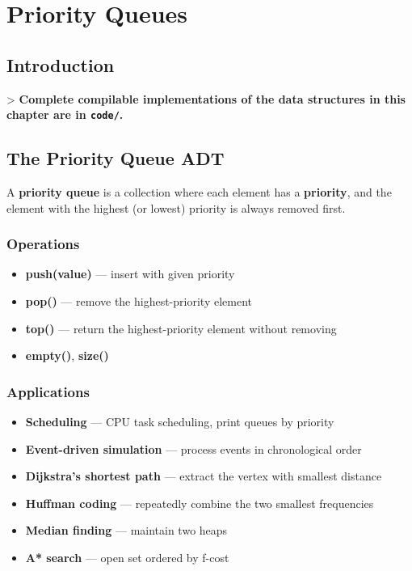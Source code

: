 \chapter{Priority Queues}\label{ch10:priority-queues}

\section{Introduction}

> \textbf{Complete compilable implementations of the data structures in this chapter are in \texttt{code/}.}

\section{The Priority Queue ADT}

A \textbf{priority queue} is a collection where each element has a \textbf{priority}, and the element with the highest (or lowest) priority is always removed first.

\subsection{Operations}

\begin{itemize}
\item \textbf{push(value)} — insert with given priority
\item \textbf{pop()} — remove the highest-priority element
\item \textbf{top()} — return the highest-priority element without removing
\item \textbf{empty()}, \textbf{size()}
\end{itemize}

\subsection{Applications}

\begin{itemize}
\item \textbf{Scheduling} — CPU task scheduling, print queues by priority
\item \textbf{Event-driven simulation} — process events in chronological order
\item \textbf{Dijkstra's shortest path} — extract the vertex with smallest distance
\item \textbf{Huffman coding} — repeatedly combine the two smallest frequencies
\item \textbf{Median finding} — maintain two heaps
\item \textbf{A* search} — open set ordered by f-cost
\end{itemize}

